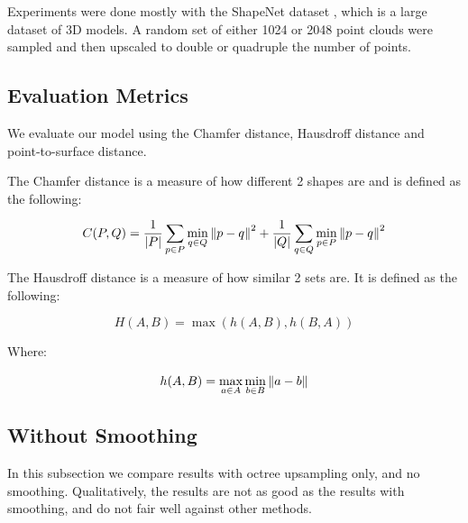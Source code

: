 Experiments were done mostly with the ShapeNet dataset \cite{shapenet}, which is a large dataset of 3D models. A random set of either 1024 or 2048 point clouds were sampled and then upscaled to double or quadruple the number of points. 

\subsection{Evaluation Metrics}

We evaluate our model using the Chamfer distance, Hausdroff distance and point-to-surface distance.

The Chamfer distance is a measure of how different 2 shapes are and is defined as the following:

$$ C(P, Q) = \dfrac{1}{|P|} \sum\limits_{p \in P} \min_{q \in Q} \left\lVert p - q\right\rVert^2 +  \dfrac{1}{|Q|} \sum\limits_{q \in Q} \min_{p \in P} \left\lVert p - q\right\rVert^2 \label{eq:chamfer}$$

The Hausdroff distance is a measure of how similar 2 sets are. It is defined as the following:

$$ H(A, B) = \max(h(A, B), h(B, A))\label{eq:hausdroff}$$

Where:

$$h(A, B) = \max_{a \in A} \min_{b \in B} \left\lVert a - b\right\rVert$$

\subsection{Without Smoothing}

In this subsection we compare results with octree upsampling only, and no smoothing. 
Qualitatively, the results are not as good as the results with smoothing, and do not fair well
against other methods.

